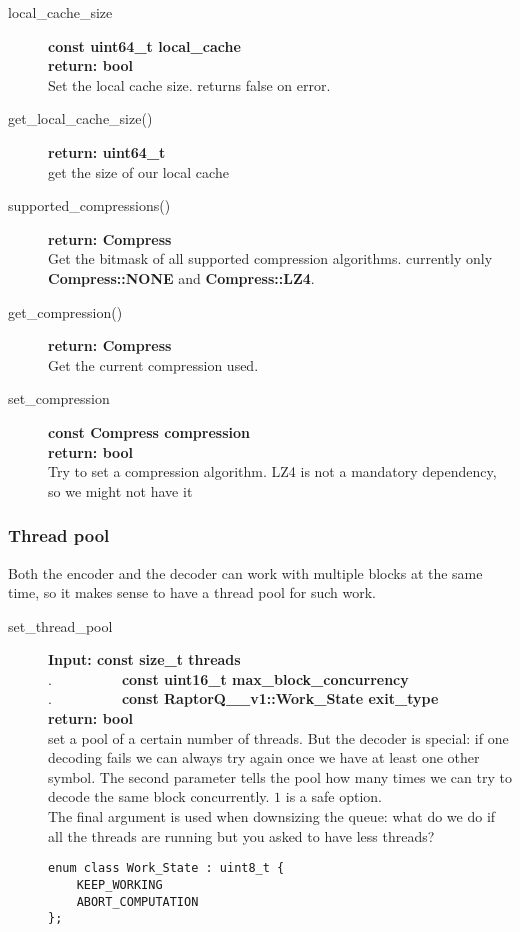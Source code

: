 \documentclass[11pt,a4paper]{refart}
\begin{document}
\begin{description}

\item[local\_cache\_size] \textbf{const uint64\_t local\_cache}\\
\textbf{return: bool}\\
Set the local cache size. returns false on error.

\item[get\_local\_cache\_size()] \textbf{return: uint64\_t}\\
get the size of our local cache

\item[supported\_compressions()] \textbf{return: Compress} \\
Get the bitmask of all supported compression algorithms. currently only \textbf{Compress::NONE} and \textbf{Compress::LZ4}.

\item[get\_compression()] \textbf{return: Compress} \\
Get the current compression used.

\item [set\_compression] \textbf{const Compress compression} \\
\textbf{return: bool}\\
Try to set a compression algorithm. LZ4 is not a mandatory dependency, so we might not have it

\end{description}

\newpage
\subsubsection{Thread pool}

Both the encoder and the decoder can work with multiple blocks at the same time, so it makes sense to have a thread pool for such work.

\begin{description}
\item[set\_thread\_pool] \textbf{Input: const size\_t threads}\\
.\ \ \ \ \ \ \ \ \ \ \textbf{const uint16\_t max\_block\_concurrency}\\
.\ \ \ \ \ \ \ \ \ \ \textbf{const RaptorQ\_\_v1::Work\_State exit\_type}\\
\textbf{return: bool}\\
set a pool of a certain number of threads. But the decoder is special: if one decoding fails we can always try again once we have at least one other symbol. The second parameter tells the pool how many times we can try to decode the same block concurrently. $1$ is a safe option.\\
The final argument is used when downsizing the queue: what do we do if all the threads are running but you asked to have less threads?
\begin{lstlisting}
enum class Work_State : uint8_t {
	KEEP_WORKING
	ABORT_COMPUTATION
};
\end{lstlisting}
\end{description}
\newpage
\end{document}
